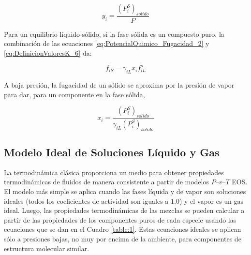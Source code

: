 \documentclass[11pt]{book}
\begin{document}
\begin{equation}
    \label{eq:Equilibrio_SolGas_2}
    y_i = \frac{(P_i^S)_{solido}}{P}
\end{equation}

Para un equilibrio líquido-sólido, si la fase sólida es un compuesto puro, la combinación de las ecuaciones \ref{eq:PotencialQuimico_Fugacidad_2} y \ref{eq:DefinicionValoresK_6} da:

\begin{equation}
    \label{eq:Equilibrio_SolLiq_1}
    f_{iS} = \gamma_{iL} x_i f_{iL}^o
\end{equation}

A baja presión, la fugacidad de un sólido se aproxima por la presión de vapor para dar, para un componente en la fase sólida,

\begin{equation}
    \label{eq:Equilibrio_SolLiq_2}
    x_i = \frac{(P_i^S)_{solido}}{\gamma_{iL} (P_i^S)_{solido}}
\end{equation}


\subsection{Modelo Ideal de Soluciones Líquido y Gas}

La termodinámica clásica proporciona un medio para obtener propiedades termodinámicas de fluidos de manera consistente a partir de modelos $P – v – T$ EOS. El modelo más simple se aplica cuando las fases líquida y de vapor son soluciones ideales (todos los coeficientes de actividad son iguales a $1.0$) y el vapor es un gas ideal. Luego, las propiedades termodinámicas de las mezclas se pueden calcular a partir de las propiedades de los componentes puros de cada especie usando las ecuaciones que se dan en el Cuadro \ref{table:1}. Estas ecuaciones ideales se aplican sólo a presiones bajas, no muy por encima de la ambiente, para componentes de estructura molecular similar.
\end{document}
